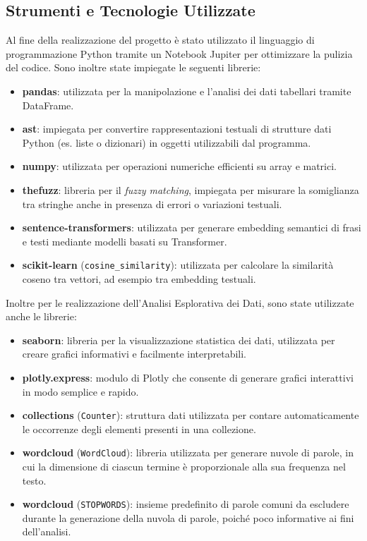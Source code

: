 \documentclass{article}
\begin{document}
\subsection{Strumenti e Tecnologie Utilizzate}
	Al fine della realizzazione del progetto \`e stato utilizzato il linguaggio di programmazione Python tramite un Notebook Jupiter per ottimizzare la pulizia del codice. Sono inoltre state impiegate le seguenti librerie:
	\begin{itemize}
		\item \textbf{pandas}: utilizzata per la manipolazione e l'analisi dei dati tabellari tramite DataFrame.
		
		\item \textbf{ast}: impiegata per convertire rappresentazioni testuali di strutture dati Python (es. liste o dizionari) in oggetti utilizzabili dal programma.
		
		\item \textbf{numpy}: utilizzata per operazioni numeriche efficienti su array e matrici.
		
		\item \textbf{thefuzz}: libreria per il \textit{fuzzy matching}, impiegata per misurare la somiglianza tra stringhe anche in presenza di errori o variazioni testuali.
		
		\item \textbf{sentence-transformers}: utilizzata per generare embedding semantici di frasi e testi mediante modelli basati su Transformer.
		
		\item \textbf{scikit-learn} (\texttt{cosine\_similarity}): utilizzata per calcolare la similarità coseno tra vettori, ad esempio tra embedding testuali.
	\end{itemize}
	Inoltre per le realizzazione dell'Analisi Esplorativa dei Dati, sono state utilizzate anche le librerie:
	\begin{itemize}
		\item \textbf{seaborn}: libreria per la visualizzazione statistica dei dati, utilizzata per creare grafici informativi e facilmente interpretabili.
		
		\item \textbf{plotly.express}: modulo di Plotly che consente di generare grafici interattivi in modo semplice e rapido.
		
		\item \textbf{collections} (\texttt{Counter}): struttura dati utilizzata per contare automaticamente le occorrenze degli elementi presenti in una collezione.
		
		\item \textbf{wordcloud} (\texttt{WordCloud}): libreria utilizzata per generare nuvole di parole, in cui la dimensione di ciascun termine \`e proporzionale alla sua frequenza nel testo.
		
		\item \textbf{wordcloud} (\texttt{STOPWORDS}): insieme predefinito di parole comuni da escludere durante la generazione della nuvola di parole, poiché poco informative ai fini dell'analisi.
	\end{itemize}
\newpage
\end{document}
